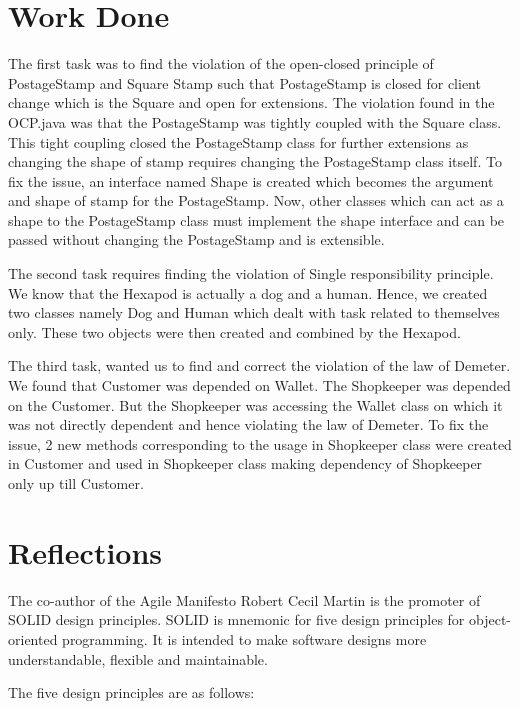 \section{Work Done}

The first task was to find the violation of the open-closed principle of PostageStamp and Square Stamp such that PostageStamp is closed for client change which is the Square and open for extensions. The violation found in the OCP.java was that the PostageStamp was tightly coupled with the Square class. This tight coupling closed the PostageStamp class for further extensions as changing the shape of stamp requires changing the PostageStamp class itself. To fix the issue, an interface named Shape is created which becomes the argument and shape of stamp for the PostageStamp. Now, other classes which can act as a shape to the PostageStamp class must implement the shape interface and can be passed without changing the PostageStamp and is extensible.

The second task requires finding the violation of Single responsibility principle. We know that the Hexapod is actually a dog and a human. Hence, we created two classes namely Dog and Human which dealt with task related to themselves only. These two objects were then created and combined by the Hexapod.

The third task, wanted us to find and correct the violation of the law of Demeter. We found that Customer was depended on Wallet. The Shopkeeper was depended on the Customer. But the Shopkeeper was accessing the Wallet class on which it was not directly dependent and hence violating the law of Demeter. To fix the issue, 2 new methods corresponding to the usage in Shopkeeper class were created in Customer and used in Shopkeeper class making dependency of Shopkeeper only up till Customer.

\section{Reflections}

The co-author of the Agile Manifesto Robert Cecil Martin is the promoter of SOLID design principles. SOLID is mnemonic for five design principles for object-oriented programming. It is intended to make software designs more understandable, flexible and maintainable.

The five design principles are as follows:

